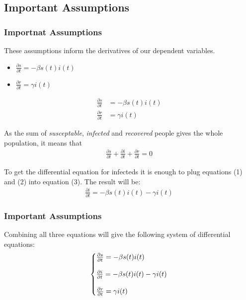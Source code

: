 \documentclass{beamer}
\makeatletter
\newenvironment{system}%
{\left\lbrace\begin{array}{@{}l@{}}}%
{\end{array}\right.}
\makeatother
\begin{document}
\subsection{Important Assumptions}
\begin{frame}[t]\frametitle{Importnat Assumptions}
These assumptions inform the derivatives of our dependent variables.
    \begin{itemize}
        \item $\frac{\partial{s}}{\partial{t}}=-\beta s(t)i(t)$
        \item $\frac{\partial{r}}{\partial{t}}=\gamma i(t)$
    \end{itemize}
\begin{align}
    \frac{\partial{s}}{\partial{t}}&=-\beta s(t)i(t)\\
    \frac{\partial{r}}{\partial{t}}&=\gamma i(t)
\end{align}

As the sum of \textit{susceptable}, \textit{infected} and \textit{recovered} people gives the whole population, it means that
\begin{align}
    \frac{\partial{s}}{\partial{t}}+\frac{\partial{i}}{\partial{t}}+\frac{\partial{r}}{\partial{t}}=0
\end{align}

To get the differential equation for infecteds it is enough to plug equations (1) and (2)
into equation (3). The result will be:
    \begin{align}
        \frac{\partial{i}}{\partial{t}}=-\beta s(t)i(t)-\gamma i(t)
    \end{align}
\end{frame}

\begin{frame}\frametitle{Important Assumptions}
Combining all three equations will give the following system of differential equations:
\begin{equation*}
    \begin{system}
        \frac{\partial{s}}{\partial{t}}=-\beta s(t)i(t)\\
        \\
        \frac{\partial{i}}{\partial{t}}=-\beta s(t)i(t)-\gamma i(t)\\
        \\
        \frac{\partial{r}}{\partial{t}}=\gamma i(t)
    \end{system}
\end{equation*}
\end{frame}
\end{document}
